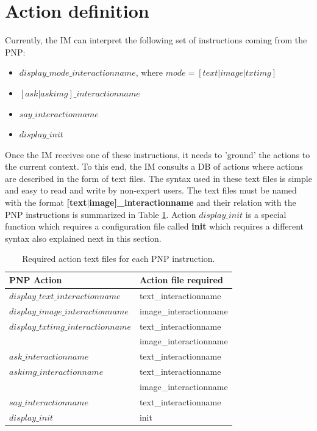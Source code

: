 \documentclass[11pt,a4paper]{article}
\begin{document}
\section{Action definition}
\label{sec:actiondef}

Currently, the IM can interpret the following set of instructions coming from the PNP:
\begin{itemize}
\item $display\_mode\_interactionname$, where $mode=[text|image|txtimg]$
\item $[ask|askimg]\_interactionname$
\item $say\_interactionname$
\item $display\_init$
\end{itemize}

Once the IM receives one of these instructions, it needs to 'ground' the actions to the current context. To this end, the IM consults a DB of actions where actions are described in the form of text files. 
The syntax used in these text files is simple and easy to read and write by non-expert users.
The text files must be named with the format \textbf{[text$|$image]\_interactionname} and their relation with the PNP instructions is summarized in Table \ref{tab:PNPtextfilerelation}. Action $display\_init$ is a special function which requires a configuration file called \textbf{init} which requires a different syntax also explained next in this section.
\begin{table}[h]
\begin{center}
  \begin{tabular}{| l | l |}
    \hline
    \textbf{PNP Action} & \textbf{Action file required} \\ \hline
    $display\_text\_interactionname$ & text\_interactionname \\ \hline
    $display\_image\_interactionname$ & image\_interactionname \\ \hline
    $display\_txtimg\_interactionname$ & text\_interactionname \\
    & image\_interactionname\\ \hline
    $ask\_interactionname$ & text\_interactionname \\ \hline
    $askimg\_interactionname$ & text\_interactionname \\
    & image\_interactionname\\ \hline
    $say\_interactionname$ & text\_interactionname \\\hline
    $display\_init$ & init \\
    \hline
  \end{tabular}
\end{center}
    \caption{Required action text files for each PNP instruction.}
    \label{tab:PNPtextfilerelation}   
\end{table}
\end{document}
